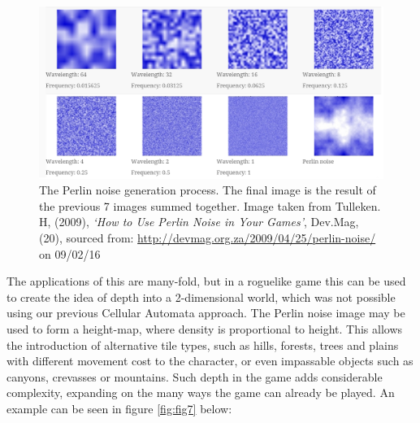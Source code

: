 \documentclass[12pt,a4paper]{article}
\begin{document}
\begin{figure}[h!]
  \centering
 	\includegraphics[scale=0.65]{images/perlingen.png}
	\caption[]{The Perlin noise generation process. The final image is the result of the previous 7 images summed together. Image taken from Tulleken. H, (2009), \emph{`How to Use Perlin Noise in Your Games'}, Dev.Mag, (20), sourced from: \url{http://devmag.org.za/2009/04/25/perlin-noise/} on 09/02/16}
	\label{fig:fig6}
\end{figure}

The applications of this are many-fold, but in a roguelike game this can be used to create the idea of depth into a 2-dimensional world, which was not possible using our previous Cellular Automata approach. The Perlin noise image may be used to form a height-map, where density is proportional to height. This allows the introduction of alternative tile types, such as hills, forests, trees and plains with different movement cost to the character, or even impassable objects such as canyons, crevasses or mountains. Such depth in the game adds considerable complexity, expanding on the many ways the game can already be played. An example can be seen in figure \ref{fig:fig7} below:
\end{document}

